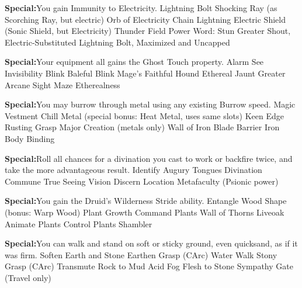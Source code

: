 \textbf{Special:}{You gain Immunity to Electricity.}
\sphere
{Lightning Bolt}
{Shocking Ray (as Scorching Ray, but electric)}
{Orb of Electricity}
{Chain Lightning}
{Electric Shield (Sonic Shield, but Electricity)}
{Thunder Field}
{Power Word: Stun}
{Greater Shout, Electric-Substituted}
{Lightning Bolt, Maximized and Uncapped}

\textbf{Special:}{Your equipment all gains the Ghost Touch property.}
\sphere
{Alarm}
{See Invisibility}
{Blink}
{Baleful Blink}
{Mage's Faithful Hound}
{Ethereal Jaunt}
{Greater Arcane Sight}
{Maze}
{Etherealness}



\textbf{Special:}{You may burrow through metal using any existing Burrow speed.}
\sphere
{Magic Vestment}
{Chill Metal (special bonus: Heat Metal, uses same slots)}
{Keen Edge}
{Rusting Grasp}
{Major Creation (metals only)}
{Wall of Iron}
{Blade Barrier}
{Iron Body}
{Binding}

\textbf{Special:}{Roll all chances for a divination you cast to work or backfire twice, and take the more advantageous result.}
\sphere
{Identify}
{Augury}
{Tongues}
{Divination}
{Commune}
{True Seeing}
{Vision}
{Discern Location}
{Metafaculty (Psionic power)}

\textbf{Special:}{You gain the Druid's Wilderness Stride ability.}
\sphere
{Entangle}
{Wood Shape (bonus: Warp Wood)}
{Plant Growth}
{Command Plants}
{Wall of Thorns}
{Liveoak}
{Animate Plants}
{Control Plants}
{Shambler}



\textbf{Special:}{You can walk and stand on soft or sticky ground, even quicksand, as if it was firm.}
\sphere
{Soften Earth and Stone}
{Earthen Grasp (CArc)}
{Water Walk}
{Stony Grasp (CArc)}
{Transmute Rock to Mud}
{Acid Fog}
{Flesh to Stone}
{Sympathy}
{Gate (Travel only)}

